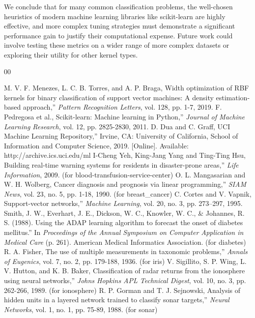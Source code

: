 \documentclass[conference]{IEEEtran}
\begin{document}
We conclude that for many common classification problems, the well-chosen heuristics of modern machine learning libraries like scikit-learn are highly effective, and more complex tuning strategies must demonstrate a significant performance gain to justify their computational expense. Future work could involve testing these metrics on a wider range of more complex datasets or exploring their utility for other kernel types.

\begin{thebibliography}{00}

 M. V. F. Menezes, L. C. B. Torres, and A. P. Braga, \texttt{}Width optimization of RBF kernels for binary classification of support vector machines: A density estimation-based approach,'' \textit{Pattern Recognition Letters}, vol. 128, pp. 1-7, 2019.
 F. Pedregosa et al., \texttt{}Scikit-learn: Machine learning in Python,'' \textit{Journal of Machine Learning Research}, vol. 12, pp. 2825-2830, 2011.
 D. Dua and C. Graff, \texttt{}UCI Machine Learning Repository,'' Irvine, CA: University of California, School of Information and Computer Science, 2019. [Online]. Available: http://archive.ics.uci.edu/ml
 I-Cheng Yeh, King-Jang Yang and Ting-Ting Hsu, \texttt{}Building real-time warning systems for residents in disaster-prone areas,'' \textit{Life Information}, 2009. (for blood-transfusion-service-center)
 O. L. Mangasarian and W. H. Wolberg, \texttt{}Cancer diagnosis and prognosis via linear programming,'' \textit{SIAM News}, vol. 23, no. 5, pp. 1-18, 1990. (for breast\_cancer)
 C. Cortes and V. Vapnik, \texttt{}Support-vector networks,'' \textit{Machine Learning}, vol. 20, no. 3, pp. 273–297, 1995.
 Smith, J. W., Everhart, J. E., Dickson, W. C., Knowler, W. C., \& Johannes, R. S. (1988). \texttt{}Using the ADAP learning algorithm to forecast the onset of diabetes mellitus.'' In \textit{Proceedings of the Annual Symposium on Computer Application in Medical Care} (p. 261). American Medical Informatics Association. (for diabetes)
 R. A. Fisher, \texttt{}The use of multiple measurements in taxonomic problems,'' \textit{Annals of Eugenics}, vol. 7, no. 2, pp. 179-188, 1936. (for iris)
 V. Sigillito, S. P. Wing, L. V. Hutton, and K. B. Baker, \texttt{}Classification of radar returns from the ionosphere using neural networks,'' \textit{Johns Hopkins APL Technical Digest}, vol. 10, no. 3, pp. 262-266, 1989. (for ionosphere)
 R. P. Gorman and T. J. Sejnowski, \texttt{}Analysis of hidden units in a layered network trained to classify sonar targets,'' \textit{Neural Networks}, vol. 1, no. 1, pp. 75-89, 1988. (for sonar)

\end{thebibliography}
\end{document}
